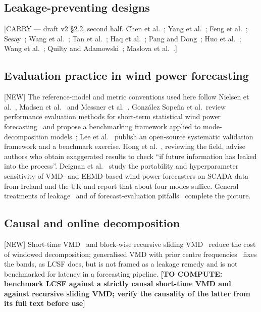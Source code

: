 \documentclass[review,3p,times]{elsarticle}
\newcommand{\todo}[1]{\textbf{[TO COMPUTE: #1]}}
\newcommand{\carry}[1]{\textsf{\small [CARRY --- #1]}}
\begin{document}
\subsection{Leakage-preventing designs}
\carry{draft v2 §2.2, second half. Chen et al.~\cite{chen2022};
Yang et al.~\cite{yang2024}; Feng et al.~\cite{feng2026};
Sesay~\cite{sesay2026}; Wang et al.~\cite{wang2024};
Tan et al.~\cite{tan2025}; Haq et al.~\cite{haq2026};
Pang and Dong~\cite{pang2026}; Huo et al.~\cite{huo2024};
Wang et al.~\cite{wangj2024}; Quilty and Adamowski~\cite{quilty2018};
Maslova et al.~\cite{maslova2015}.}

\subsection{Evaluation practice in wind power forecasting}
\textsf{[NEW]} The reference-model and metric conventions used here follow
Nielsen et al.~\cite{nielsen1998}, Madsen et al.~\cite{madsen2005} and
Messner et al.~\cite{messner2020}. González Sopeña et al.\ review performance
evaluation methods for short-term statistical wind power
forecasting~\cite{sopena2020} and propose a benchmarking framework applied to
mode-decomposition models~\cite{sopena2022}; Lee et al.~\cite{lee2022} publish
an open-source systematic validation framework and a benchmark exercise.
Hong et al.~\cite{hong2020}, reviewing the field, advise authors who obtain
exaggerated results to check ``if future information has leaked into the
process''. Deignan et al.~\cite{deignan2025} study the portability and
hyperparameter sensitivity of VMD- and EEMD-based wind power forecasters on
SCADA data from Ireland and the UK and report that about four modes suffice.
General treatments of leakage~\cite{kaufman2012,kapoor2023,rosenblatt2024} and
of forecast-evaluation pitfalls~\cite{hewamalage2023} complete the picture.

\subsection{Causal and online decomposition}
\textsf{[NEW]} Short-time VMD~\cite{jia2026} and block-wise recursive sliding
VMD~\cite{dan2023} reduce the cost of windowed decomposition; generalised VMD
with prior centre frequencies~\cite{guo2021} fixes the bands, as LCSF does,
but is not framed as a leakage remedy and is not benchmarked for latency in a
forecasting pipeline. \todo{benchmark LCSF against a strictly causal
short-time VMD and against recursive sliding VMD; verify the causality of the
latter from its full text before use}
\end{document}
